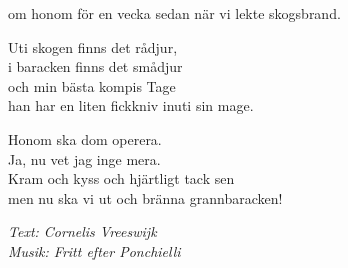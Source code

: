 om honom för en vecka sedan när vi lekte skogsbrand.\par
\vspace{10pt}
Uti skogen finns det rådjur,\\
i baracken finns det smådjur\\
och min bästa kompis Tage\\
han har en liten fickkniv inuti sin mage.\par
\vspace{10pt}
Honom ska dom operera.\\
Ja, nu vet jag inge mera.\\
Kram och kyss och hjärtligt tack sen\\
men nu ska vi ut och bränna grannbaracken!\par
\vspace{10pt}
{\footnotesize\textit{Text: Cornelis Vreeswijk \\ Musik: Fritt efter Ponchielli}}
